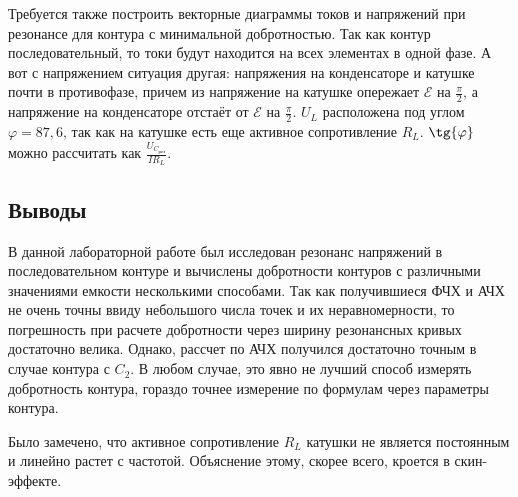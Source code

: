 \documentclass[a4paper, 12pt]{article}
\newcommand{\E}{\mathcal{E}}
\begin{document}

	Требуется также построить векторные диаграммы токов и напряжений при резонансе для контура с минимальной добротностью. Так как контур последовательный, то токи будут находится на всех элементах в одной фазе. А вот с напряжением ситуация другая: напряжения на конденсаторе и катушке почти в противофазе, причем из напряжение на катушке опережает $\E$ на $\frac{\pi}{2}$, а напряжение на конденсаторе отстаёт от $\E$ на $\frac{\pi}{2}$.
	$U_L$ расположена под углом $\varphi = 87,6$\textdegree, так как на катушке есть еще активное сопротивление $R_L$. $\tg{\varphi}$ можно рассчитать как $\frac{U_{C_{\text{рез}}}}{IR_L}$.

	\subsection*{Выводы}

	В данной лабораторной работе был исследован резонанс напряжений в последовательном контуре и вычислены добротности контуров с различными значениями емкости несколькими способами. Так как получившиеся ФЧХ и АЧХ не очень точны ввиду небольшого числа точек и их неравномерности, то погрешность при расчете добротности через ширину резонансных кривых достаточно велика. Однако, рассчет по АЧХ получился достаточно точным в случае контура с $C_2$. В любом случае, это явно не лучший способ измерять добротность контура, гораздо точнее измерение по формулам через параметры контура.

	Было замечено, что активное сопротивление $R_L$ катушки не является постоянным и линейно растет с частотой. Объяснение этому, скорее всего, кроется в скин-эффекте.
\end{document}
